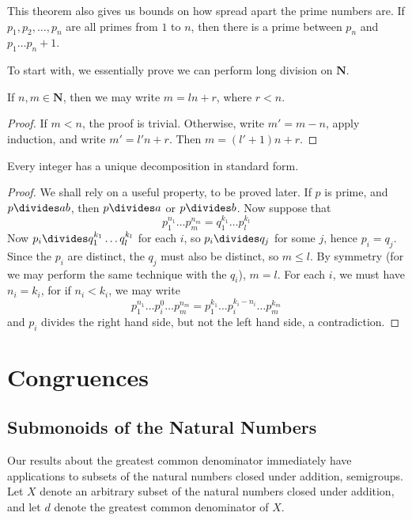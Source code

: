 This theorem also gives us bounds on how spread apart the prime numbers are. If $p_1, p_2, \dots, p_n$ are all primes from $1$ to $n$, then there is a prime between $p_n$ and $p_1 \dots p_n + 1$.

To start with, we essentially prove we can perform long division on $\mathbf{N}$.

\begin{lemma}
    If $n,m \in \mathbf{N}$, then we may write $m = ln + r$, where $r < n$.
\end{lemma}
\begin{proof}
    If $m < n$, the proof is trivial. Otherwise, write $m' = m - n$, apply induction, and write $m' = l'n + r$. Then $m = (l' + 1)n + r$.
\end{proof}

\begin{theorem}
    Every integer has a unique decomposition in standard form.
\end{theorem}
\begin{proof}
    We shall rely on a useful property, to be proved later. If $p$ is prime, and $p \divides ab$, then $p \divides a$ or $p \divides b$. Now suppose that
    \[ p_1^{n_1} \dots p_m^{n_m} = q_1^{k_1} \dots p_l^{k_l} \]
    Now $p_i \divides q_1^{k_1} \dots q_l^{k_l}$ for each $i$, so $p_i \divides q_j$ for some $j$, hence $p_i = q_j$. Since the $p_i$ are distinct, the $q_j$ must also be distinct, so $m \leq l$. By symmetry (for we may perform the same technique with the $q_i$), $m = l$. For each $i$, we must have $n_i = k_i$, for if $n_i < k_i$, we may write
    \[ p_1^{n_1} \dots p_i^0 \dots p_m^{n_m} = p_1^{k_1} \dots p_i^{k_i - n_i} \dots p_m^{k_m} \]
    and $p_i$ divides the right hand side, but not the left hand side, a contradiction.
\end{proof}

\chapter{Congruences}

\section{Submonoids of the Natural Numbers}

Our results about the greatest common denominator immediately have applications to subsets of the natural numbers closed under addition, semigroups. Let $X$ denote an arbitrary subset of the natural numbers closed under addition, and let $d$ denote the greatest common denominator of $X$.


